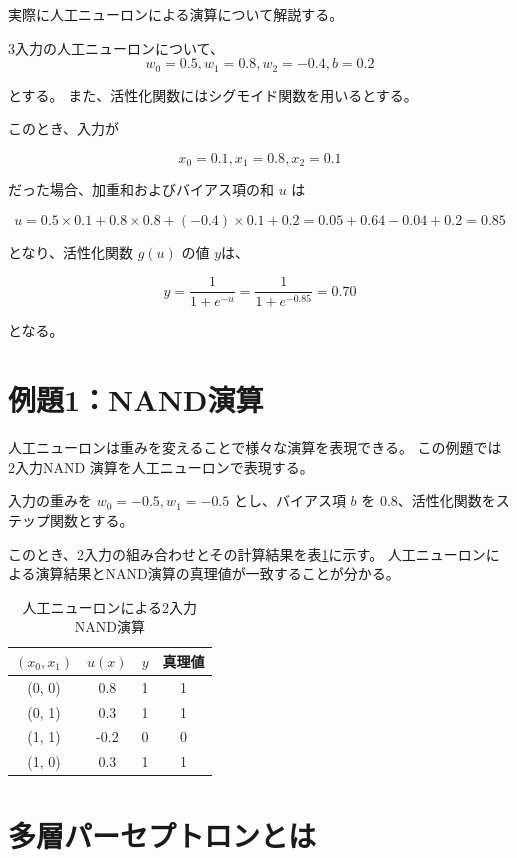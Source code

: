 実際に人工ニューロンによる演算について解説する。

3入力の人工ニューロンについて、
\[ w_0 = 0.5, w_1 = 0.8, w_2 = -0.4, b = 0.2\]

とする。
また、活性化関数にはシグモイド関数を用いるとする。

このとき、入力が

\[ x_0 = 0.1, x_1 = 0.8, x_2 = 0.1\]

だった場合、加重和およびバイアス項の和 $u$ は

\[
    u = 0.5 \times 0.1 + 0.8 \times 0.8 + (-0.4) \times 0.1 + 0.2
    = 0.05 + 0.64 - 0.04 + 0.2
    = 0.85
\]

となり、活性化関数 $g(u)$ の値 $y$は、

\[ y = \frac{1}{1+e^{-u}}
     = \frac{1}{1+e^{-0.85}}
     = 0.70
\]

となる。

\section{例題1：NAND演算}

人工ニューロンは重みを変えることで様々な演算を表現できる。
この例題では 2入力NAND 演算を人工ニューロンで表現する。

入力の重みを $w_0 = -0.5, w_1 = -0.5$ とし、バイアス項 $b$ を 0.8、活性化関数をステップ関数とする。

このとき、2入力の組み合わせとその計算結果を表\ref{tab:nand}に示す。
人工ニューロンによる演算結果とNAND演算の真理値が一致することが分かる。

\begin{table}[htb]
    \begin{center}
        \caption{人工ニューロンによる2入力NAND演算}
        \begin{tabular}{cccc}
            \toprule
            $(x_0, x_1)$ & $u(x)$ & $y$ & 真理値 \\
            \midrule
            (0, 0) &  0.8 & 1 & 1\\
            (0, 1) & 0.3 & 1 &1 \\
            (1, 1) & -0.2 & 0 & 0\\
            (1, 0) & 0.3 & 1 & 1\\ 
            \bottomrule            
        \end{tabular}
        \label{tab:nand}
    \end{center}
\end{table}

\section{多層パーセプトロンとは}

